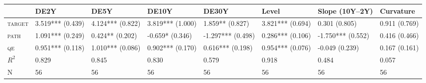 \begin{tabular}{llllllll}
\toprule
 & DE2Y & DE5Y & DE10Y & DE30Y & Level & Slope (10Y--2Y) & Curvature \\
\midrule
\textsc{target} & 3.519*** (0.439) & 4.124*** (0.822) & 3.819*** (1.000) & 1.859** (0.827) & 3.821*** (0.694) & 0.301 (0.805) & 0.911 (0.769) \\
\textsc{path} & 1.091*** (0.249) & 0.424** (0.202) & -0.659* (0.346) & -1.297*** (0.498) & 0.286*** (0.106) & -1.750*** (0.552) & 0.416 (0.466) \\
\textsc{qe} & 0.951*** (0.118) & 1.010*** (0.086) & 0.902*** (0.170) & 0.616*** (0.198) & 0.954*** (0.076) & -0.049 (0.239) & 0.167 (0.161) \\
$R^2$ & 0.829 & 0.845 & 0.830 & 0.579 & 0.918 & 0.484 & 0.057 \\
N & 56 & 56 & 56 & 56 & 56 & 56 & 56 \\
\bottomrule
\end{tabular}
